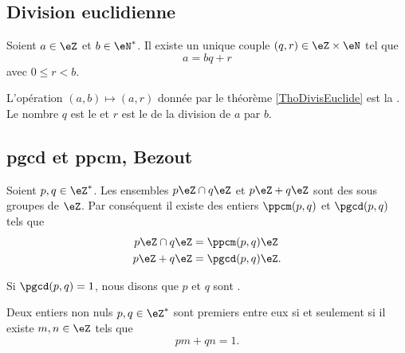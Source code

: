 \subsection{Division euclidienne}

\begin{theorem}     \label{ThoDivisEuclide}
    Soient \( a\in\eZ\) et \( b\in\eN^*\). Il existe un unique couple \( (q,r)\in\eZ\times\eN\) tel que
    \begin{equation}
        a=bq+r
    \end{equation}
    avec \( 0\leq r<b\).
\end{theorem}

L'opération \( (a,b)\mapsto(a,r)\) donnée par le théorème \ref{ThoDivisEuclide} est la . Le nombre \( q\) est le  et \( r\) est le  de la division de \( a\) par \( b\).

\subsection{pgcd et ppcm, Bezout}

Soient \( p,q\in\eZ^*\). Les ensembles \( p\eZ\cap q\eZ\) et \( p\eZ+q\eZ\) sont des sous groupes de \( \eZ\). Par conséquent il existe des entiers \( \ppcm(p,q)\) et \( \pgcd(p,q)\) tels que
\begin{subequations}
    \begin{align}
        p\eZ\cap q\eZ&=\ppcm(p,q)\eZ\\
        p\eZ + q\eZ&=\pgcd(p,q)\eZ.
    \end{align}
\end{subequations}

Si \( \pgcd(p,q)=1\), nous disons que \( p\) et \( q\) sont .

\begin{theorem} \label{ThoBuNjam}
    Deux entiers non nuls \( p,q\in\eZ^*\) sont premiers entre eux si et seulement si il existe \( m,n\in\eZ\) tels que 
    \begin{equation}
        pm+qn=1.
    \end{equation}
\end{theorem}

